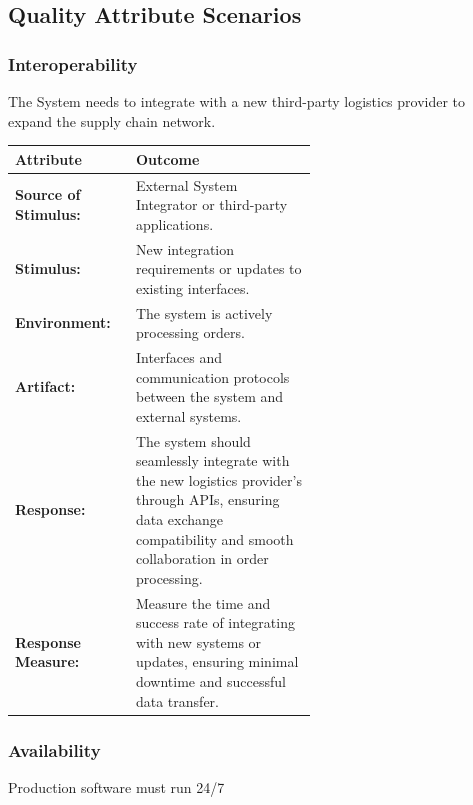 \documentclass[conference]{IEEEtran}
\begin{document}
\subsection{Quality Attribute Scenarios}
\label{sec:qas}


\subsubsection{\textbf{Interoperability}}The System needs to integrate with a new third-party logistics provider to expand the supply chain network.

\begin{table}[h]
    \centering
    \begin{tabular}{|l|p{0.6\linewidth}|}
        \hline
        \textbf{Attribute} & \textbf{Outcome} \\
        \hline
        \textbf{Source of Stimulus:} & External System Integrator or third-party applications. \\
        \hline
        \textbf{Stimulus:} & New integration requirements or updates to existing interfaces. \\
        \hline
        \textbf{Environment:} & The system is actively processing orders. \\
        \hline
        \textbf{Artifact:} & Interfaces and communication protocols between the system and external systems. \\
        \hline
        \textbf{Response:} & The system should seamlessly integrate with the new logistics provider's through APIs, ensuring data exchange compatibility and smooth collaboration in order processing. \\
        \hline
        \textbf{Response Measure:} & Measure the time and success rate of integrating with new systems or updates, ensuring minimal downtime and successful data transfer. \\
        \hline
    \end{tabular}
\end{table}


\subsubsection{\textbf{Availability}}Production software must run 24/7
\end{document}
